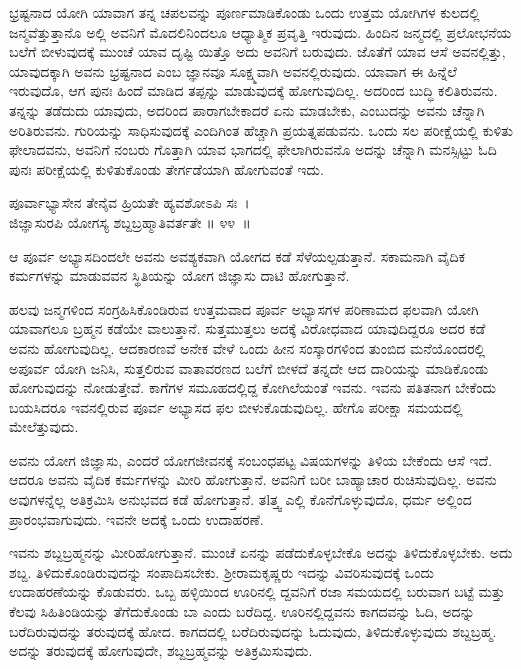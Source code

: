 ಭ್ರಷ್ಟನಾದ ಯೋಗಿ ಯಾವಾಗ ತನ್ನ ಚಪಲವನ್ನು ಪೂರ್ಣಮಾಡಿಕೊಂಡು ಒಂದು ಉತ್ತಮ ಯೋಗಿಗಳ ಕುಲದಲ್ಲಿ ಜನ್ಮವೆತ್ತುತ್ತಾನೊ ಅಲ್ಲಿ ಅವನಿಗೆ ಮೊದಲಿನಿಂದಲೂ ಆಧ್ಯಾತ್ಮಿಕ ಪ್ರವೃತ್ತಿ ಇರುವುದು. ಹಿಂದಿನ ಜನ್ಮದಲ್ಲಿ ಪ್ರಲೋಭನೆಯ ಬಲೆಗೆ ಬೀಳುವುದಕ್ಕೆ ಮುಂಚೆ ಯಾವ ದೃಷ್ಟಿ ಯಿತ್ತೊ ಅದು ಅವನಿಗೆ ಬರುವುದು. ಜೊತೆಗೆ ಯಾವ ಆಸೆ ಅವನಲ್ಲಿತ್ತು, ಯಾವುದಕ್ಕಾಗಿ ಅವನು ಭ್ರಷ್ಟನಾದ ಎಂಬ ಜ್ಞಾನವೂ ಸೂಕ್ಷ್ಮವಾಗಿ ಅವನಲ್ಲಿರುವುದು. ಯಾವಾಗ ಈ ಹಿನ್ನೆಲೆ ಇರುವುದೊ, ಆಗ ಪುನಃ ಹಿಂದೆ ಮಾಡಿದ ತಪ್ಪನ್ನು ಮಾಡುವುದಕ್ಕೆ ಹೋಗುವುದಿಲ್ಲ. ಅದರಿಂದ ಬುದ್ಧಿ ಕಲಿತಿರುವನು. ತನ್ನನ್ನು ತಡೆದುದು ಯಾವುದು, ಅದರಿಂದ ಪಾರಾಗಬೇಕಾದರೆ ಏನು ಮಾಡಬೇಕು, ಎಂಬುದನ್ನು ಅವನು ಚೆನ್ನಾಗಿ ಅರಿತಿರುವನು. ಗುರಿಯನ್ನು ಸಾಧಿಸುವುದಕ್ಕೆ ಎಂದಿಗಿಂತ ಹೆಚ್ಚಾಗಿ ಪ್ರಯತ್ನಪಡುವನು. ಒಂದು ಸಲ ಪರೀಕ್ಷೆಯಲ್ಲಿ ಕುಳಿತು ಫೇಲಾದವನು, ಅವನಿಗೆ ನಂಬರು ಗೊತ್ತಾಗಿ ಯಾವ ಭಾಗದಲ್ಲಿ ಫೇಲಾಗಿರುವನೊ ಅದನ್ನು ಚೆನ್ನಾಗಿ ಮನಸ್ಸಿಟ್ಟು ಓದಿ ಪುನಃ ಪರೀಕ್ಷೆಯಲ್ಲಿ ಕುಳಿತುಕೊಂಡು ತೇರ್ಗಡೆಯಾಗಿ ಹೋಗುವಂತೆ ಇದು.

\begin{shloka}
ಪೂರ್ವಾಭ್ಯಾಸೇನ ತೇನೈವ ಹ್ರಿಯತೇ ಹ್ಯವಶೋಽಪಿ ಸಃ~।\\ಜಿಜ್ಞಾಸುರಪಿ ಯೋಗಸ್ಯ ಶಬ್ದಬ್ರಹ್ಮಾತಿವರ್ತತೇ \hfill॥ ೪೪~॥
\end{shloka}

\begin{artha}
ಆ ಪೂರ್ವ ಅಭ್ಯಾಸದಿಂದಲೇ ಅವನು ಅವಶ್ಯಕವಾಗಿ ಯೋಗದ ಕಡೆ ಸೆಳೆಯಲ್ಪಡುತ್ತಾನೆ. ಸಕಾಮನಾಗಿ ವೈದಿಕ ಕರ್ಮಗಳನ್ನು ಮಾಡುವವನ ಸ್ಥಿತಿಯನ್ನು ಯೋಗ ಜಿಜ್ಞಾಸು ದಾಟಿ ಹೋಗುತ್ತಾನೆ.
\end{artha}

ಹಲವು ಜನ್ಮಗಳಿಂದ ಸಂಗ್ರಹಿಸಿಕೊಂಡಿರುವ ಉತ್ತಮವಾದ ಪೂರ್ವ ಅಭ್ಯಾಸಗಳ ಪರಿಣಾಮದ ಫಲವಾಗಿ ಯೋಗಿ ಯಾವಾಗಲೂ ಬ್ರಹ್ಮನ ಕಡೆಯೇ ವಾಲುತ್ತಾನೆ. ಸುತ್ತಮುತ್ತಲು ಅದಕ್ಕೆ ವಿರೋಧವಾದ ಯಾವುದಿದ್ದರೂ ಅದರ ಕಡೆ ಅವನು ಹೋಗುವುದಿಲ್ಲ. ಆದಕಾರಣವೆ ಅನೇಕ ವೇಳೆ ಒಂದು ಹೀನ ಸಂಸ್ಕಾರಗಳಿಂದ ತುಂಬಿದ ಮನೆಯೊಂದರಲ್ಲಿ ಅಪೂರ್ವ ಯೋಗಿ ಜನಿಸಿ, ಸುತ್ತಲಿರುವ ವಾತಾವರಣದ ಬಲೆಗೆ ಬೀಳದೆ ತನ್ನದೇ ಆದ ದಾರಿಯನ್ನು ಮಾಡಿಕೊಂಡು ಹೋಗುವುದನ್ನು ನೋಡುತ್ತೇವೆ. ಕಾಗೆಗಳ ಸಮೂಹದಲ್ಲಿದ್ದ ಕೋಗಿಲೆಯಂತೆ ಇವನು. ಇವನು ಪತಿತನಾಗ ಬೇಕೆಂದು ಬಯಸಿದರೂ ಇವನಲ್ಲಿರುವ ಪೂರ್ವ ಅಭ್ಯಾಸದ ಫಲ ಬೀಳುಕೊಡುವುದಿಲ್ಲ. ಹೇಗೊ ಪರೀಕ್ಷಾ ಸಮಯದಲ್ಲಿ ಮೇಲೆತ್ತುವುದು.

ಅವನು ಯೋಗ ಜಿಜ್ಞಾಸು, ಎಂದರೆ ಯೋಗಜೀವನಕ್ಕೆ ಸಂಬಂಧಪಟ್ಟ ವಿಷಯಗಳನ್ನು ತಿಳಿಯ ಬೇಕೆಂದು ಆಸೆ ಇದೆ. ಆದರೂ ಅವನು ವೈದಿಕ ಕರ್ಮಗಳನ್ನು ಮೀರಿ ಹೋಗುತ್ತಾನೆ. ಅವನಿಗೆ ಬರೀ ಬಾಹ್ಯಾಚಾರ ರುಚಿಸುವುದಿಲ್ಲ. ಅವನು ಅವುಗಳನ್ನೆಲ್ಲ ಅತಿಕ್ರಮಿಸಿ ಅನುಭವದ ಕಡೆ ಹೋಗುತ್ತಾನೆ. ತlತ್ತ್ವ ಎಲ್ಲಿ ಕೊನೆಗೊಳ್ಳುವುದೊ, ಧರ್ಮ ಅಲ್ಲಿಂದ ಪ್ರಾರಂಭವಾಗುವುದು. ಇವನೇ ಅದಕ್ಕೆ ಒಂದು ಉದಾಹರಣೆ.

ಇವನು ಶಬ್ದಬ್ರಹ್ಮನನ್ನು ಮೀರಿಹೋಗುತ್ತಾನೆ. ಮುಂಚೆ ಏನನ್ನು ಪಡೆದುಕೊಳ್ಳಬೇಕೊ ಅದನ್ನು ತಿಳಿದುಕೊಳ್ಳಬೇಕು. ಅದು ಶಬ್ದ. ತಿಳಿದುಕೊಂಡಿರುವುದನ್ನು ಸಂಪಾದಿಸಬೇಕು. ಶ‍್ರೀರಾಮಕೃಷ್ಣರು ಇದನ್ನು ವಿವರಿಸುವುದಕ್ಕೆ ಒಂದು ಉದಾಹರಣೆಯನ್ನು ಕೊಡುವರು. ಒಬ್ಬ ಹಳ್ಳಿಯಿಂದ ಊರಿನಲ್ಲಿ ದ್ದವನಿಗೆ ರಜಾ ಸಮಯದಲ್ಲಿ ಬರುವಾಗ ಬಟ್ಟೆ ಮತ್ತು ಕೆಲವು ಸಿಹಿತಿಂಡಿಯನ್ನು ತೆಗೆದುಕೊಂಡು ಬಾ ಎಂದು ಬರೆದಿದ್ದ. ಊರಿನಲ್ಲಿದ್ದವನು ಕಾಗದವನ್ನು ಓದಿ, ಅದನ್ನು ಬರೆದಿರುವುದನ್ನು ತರುವುದಕ್ಕೆ ಹೋದ. ಕಾಗದದಲ್ಲಿ ಬರೆದಿರುವುದನ್ನು ಓದುವುದು, ತಿಳಿದುಕೊಳ್ಳುವುದು ಶಬ್ದಬ್ರಹ್ಮ. ಅದನ್ನು ತರುವುದಕ್ಕೆ ಹೋಗುವುದೇ, ಶಬ್ದಬ್ರಹ್ಮವನ್ನು ಅತಿಕ್ರಮಿಸುವುದು.

